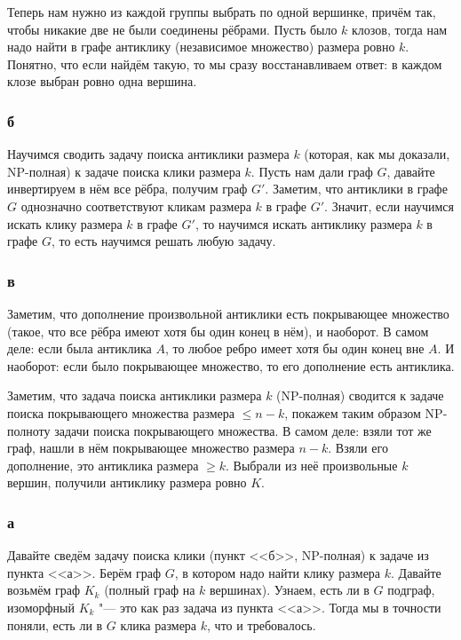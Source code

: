 		Теперь нам нужно из каждой группы выбрать по одной вершинке, причём так, чтобы никакие две не были соединены рёбрами.
		Пусть было $k$ клозов, тогда нам надо найти в графе антиклику (независимое множество) размера ровно $k$.
		Понятно, что если найдём такую, то мы сразу восстанавливаем ответ: в каждом клозе выбран ровно одна вершина.

	\subsubsection{б}
		Научимся сводить задачу поиска антиклики размера $k$ (которая, как мы доказали, NP-полная) к задаче поиска клики размера $k$.
		Пусть нам дали граф $G$, давайте инвертируем в нём все рёбра, получим граф $G'$.
		Заметим, что антиклики в графе $G$ однозначно соответствуют кликам размера $k$ в графе $G'$.
		Значит, если научимся искать клику размера $k$ в графе $G'$, то научимся искать антиклику размера
		$k$ в графе $G$, то есть научимся решать любую задачу.

	\subsubsection{в}
		Заметим, что дополнение произвольной антиклики есть покрывающее множество (такое,
		что все рёбра имеют хотя бы один конец в нём), и наоборот.
		В самом деле: если была антиклика $A$, то любое ребро имеет хотя бы один конец вне $A$.
		И наоборот: если было покрывающее множество, то его дополнение есть антиклика.

		Заметим, что задача поиска антиклики размера $k$ (NP-полная) сводится к задаче поиска
		покрывающего множества размера $\le n-k$, покажем таким образом NP-полноту задачи
		поиска покрывающего множества.
		В самом деле: взяли тот же граф, нашли в нём покрывающее множество размера $n-k$.
		Взяли его дополнение, это антиклика размера $\ge k$.
		Выбрали из неё произвольные $k$ вершин, получили антиклику размера ровно $K$.

	\subsubsection{а}
		Давайте сведём задачу поиска клики (пункт <<б>>, NP-полная) к задаче из пункта <<а>>.
		Берём граф $G$, в котором надо найти клику размера $k$.
		Давайте возьмём граф $K_k$ (полный граф на $k$ вершинах).
		Узнаем, есть ли в $G$ подграф, изоморфный $K_k$ "--- это как раз задача из пункта <<а>>.
		Тогда мы в точности поняли, есть ли в $G$ клика размера $k$, что и требовалось.

